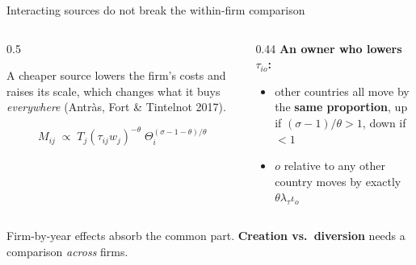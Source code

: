 \documentclass[11pt,aspectratio=169,notes]{beamer}
\begin{document}
\begin{frame}{Interacting sources do not break the within-firm comparison}
\vspace{0.2cm}
\begin{columns}[T]
\begin{column}{0.5\textwidth}
\begin{wordsbox}
A cheaper source lowers the firm's costs and raises its scale, which changes what it buys \emph{everywhere} (Antr\`as, Fort \& Tintelnot 2017).
\end{wordsbox}
\vspace{0.15cm}
\begin{mathbox}
\[
M_{ij}\;\propto\;T_j(\tau_{ij}w_j)^{-\theta}\;\Theta_i^{(\sigma-1-\theta)/\theta}
\]
\end{mathbox}
\end{column}
\begin{column}{0.44\textwidth}
\textbf{An owner who lowers $\tau_{io}$:}
\vspace{0.15cm}
\begin{itemize}\setlength{\itemsep}{5pt}
\item other countries all move by the \textbf{same proportion}, up if $(\sigma-1)/\theta>1$, down if $<1$
\item $o$ relative to any other country moves by exactly $\theta\lambda_\tau\iota_o$
\end{itemize}
\end{column}
\end{columns}
\vspace{0.3cm}
{\small Firm-by-year effects absorb the common part. \textbf{Creation vs.\ diversion} needs a comparison \emph{across} firms.}
\end{frame}
\end{document}
